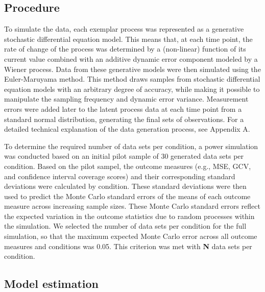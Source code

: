 \documentclass[man, floatsintext]{apa7}
\begin{document}
\subsection{Procedure}

To simulate the data, each exemplar process was represented as a generative
stochastic differential equation model. This means that, at each time point,
the rate of change of the
process was determined by a (non-linear) function of its current value combined
with an
additive dynamic error component modeled by a Wiener process. Data from these
generative models were then simulated using the Euler-Maruyama method.
This method draws samples from stochastic differential equation
models with an arbitrary degree of accuracy, while making it possible to
manipulate the sampling frequency and dynamic error variance.
Measurement errors were added later to the latent process data at
each time point from a standard normal distribution, generating the final sets
of observations. For a detailed technical explanation of the data generation
process, see Appendix A.

To determine the required number of data sets per condition, a
power simulation was conducted
based on an initial pilot sample of 30 generated data sets per
condition. Based on the pilot sampel, the outcome measures
(e.g., MSE, GCV, and confidence interval coverage scores) and their
corresponding standard deviations were calculated by condition.
These standard deviations were then used to
predict the Monte Carlo standard errors of the means of each outcome measure
across increasing sample sizes. These Monte Carlo standard errors reflect the
expected variation in the outcome statistics due to random processes within the
simulation. We selected the number of data sets per condition for the full
simulation, so that the
maximum expected Monte Carlo error across all outcome measures
and conditions was 0.05. This criterion was met with \textbf{N} data sets per
condition.

\subsection{Model estimation}
\end{document}

